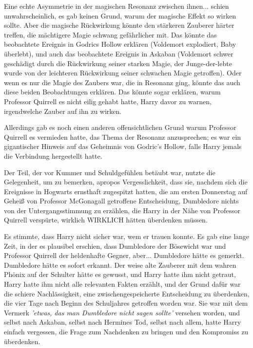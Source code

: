 Eine echte Asymmetrie in der magischen Resonanz zwischen ihnen... schien
unwahrscheinlich, es gab keinen Grund, warum der magische Effekt so wirken
sollte. Aber die magische Rückwirkung könnte den stärkeren Zauberer härter
treffen, die mächtigere Magie schwang gefährlicher mit. Das könnte das
beobachtete Ereignis in Godrics Hollow erklären (Voldemort explodiert, Baby
überlebt), und auch das beobachtete Ereignis in Askaban (Voldemort schwer
geschädigt durch die Rückwirkung seiner starken Magie, der Junge-der-lebte wurde
von der leichteren Rückwirkung seiner schwachen Magie getroffen). Oder wenn es
nur die Magie des Zaubers war, die in Resonanz ging, könnte das auch diese
beiden Beobachtungen erklären. Das könnte sogar erklären, warum Professor
Quirrell es nicht eilig gehabt hatte, Harry davor zu warnen, irgendwelche Zauber
auf ihn zu wirken.

Allerdings gab es noch einen anderen offensichtlichen Grund warum Professor
Quirrell es vermieden hatte, das Thema der Resonanz anzusprechen; es war ein
gigantischer Hinweis auf das Geheimnis von Godric's Hollow, falls Harry jemals
die Verbindung hergestellt hatte.

Der Teil, der vor Kummer und Schuldgefühlen betäubt war, nutzte die Gelegenheit,
um zu bemerken, apropos Vergesslichkeit, dass sie, nachdem sich die Ereignisse
in Hogwarts ernsthaft zugespitzt hatten, die am ersten Donnerstag auf Geheiß von
Professor McGonagall getroffene Entscheidung, Dumbledore nichts von der
Untergangsstimmung zu erzählen, die Harry in der Nähe von Professor Quirrell
verspürte, wirklich WIRKLICH hätten überdenken müssen.

Es stimmte, dass Harry nicht sicher war, wem er trauen konnte. Es gab eine lange
Zeit, in der es plausibel erschien, dass Dumbledore der Bösewicht war und
Professor Quirrell der heldenhafte Gegner, aber... Dumbledore hätte es gemerkt.
Dumbledore hätte es sofort erkannt. Der weise alte Zauberer mit dem wahren
Phönix auf der Schulter hätte es gewusst, und Harry hatte ihm nicht getraut,
Harry hatte ihm nicht alle relevanten Fakten erzählt, und der Grund dafür war
die schiere Nachlässigkeit, eine zwischengespeicherte Entscheidung zu
überdenken, die vier Tage nach Beginn des Schuljahres getroffen worden war. Sie
war mit dem Vermerk\emph{ 'etwas, das man Dumbledore nicht sagen sollte'
}versehen worden, und selbst nach Askaban, selbst nach Hermines Tod, selbst nach
allem, hatte Harry einfach vergessen, die Frage zum Nachdenken zu bringen und
den Kompromiss zu überdenken.


